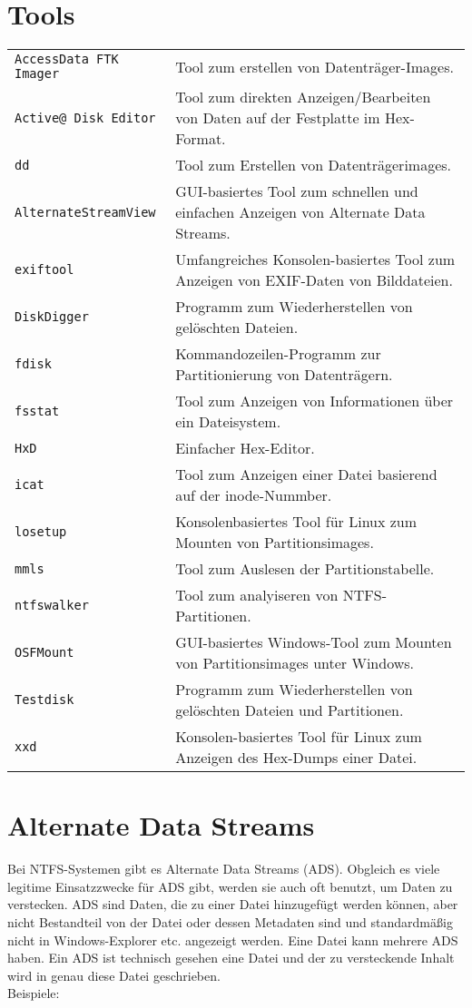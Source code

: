 \begin{multicols}{3}
\section{Tools}
\begin{tabular}{@{}p{\the\MyLen}
		@{}p{\linewidth-\the\MyLen}@{}}
	\texttt{AccessData FTK Imager} & Tool zum erstellen von Datenträger-Images.\\
	\texttt{Active@ Disk Editor} & Tool zum direkten Anzeigen/Bearbeiten von Daten auf der Festplatte im Hex-Format.\\
	\texttt{dd} & Tool zum Erstellen von Datenträgerimages.\\
	\texttt{Alternate\-Stream\-View} & GUI-basiertes Tool zum schnellen und einfachen Anzeigen von Alternate Data Streams.\\
	\texttt{exiftool} & Umfangreiches Konsolen-basiertes Tool zum Anzeigen von EXIF-Daten von Bilddateien.\\
	\texttt{DiskDigger} & Programm zum Wiederherstellen von gelöschten Dateien.\\
	\texttt{fdisk} & Kommandozeilen-Programm zur Partitionierung von Datenträgern.\\
	\texttt{fsstat} & Tool zum Anzeigen von Informationen über ein Dateisystem.\\
	\texttt{HxD} & Einfacher Hex-Editor.\\
	\texttt{icat} & Tool zum Anzeigen einer Datei basierend auf der inode-Nummber.\\
	\texttt{losetup} & Konsolenbasiertes Tool für Linux zum Mounten von Partitionsimages.\\
	\texttt{mmls} & Tool zum Auslesen der Partitionstabelle.\\
	\texttt{ntfswalker} & Tool zum analyiseren von NTFS-Partitionen.\\
	\texttt{OSFMount} & GUI-basiertes Windows-Tool zum Mounten von Partitionsimages unter Windows.\\
	\texttt{Testdisk} & Programm zum Wiederherstellen von gelöschten Dateien und Partitionen.\\
	\texttt{xxd} & Konsolen-basiertes Tool für Linux zum Anzeigen des Hex-Dumps einer Datei.\\
\end{tabular}
\section{Alternate Data Streams}
Bei NTFS-Systemen gibt es Alternate Data Streams (ADS). Obgleich es viele legitime Einsatzzwecke für ADS gibt, werden sie auch oft benutzt, um Daten zu verstecken. ADS sind Daten, die zu einer Datei hinzugefügt werden können, aber nicht Bestandteil von der Datei oder dessen Metadaten sind und standardmäßig nicht in Windows-Explorer etc. angezeigt werden. Eine Datei kann mehrere ADS haben. Ein ADS ist technisch gesehen eine Datei und der zu versteckende Inhalt wird in genau diese Datei geschrieben.\\
Beispiele:\\


\end{multicols}
